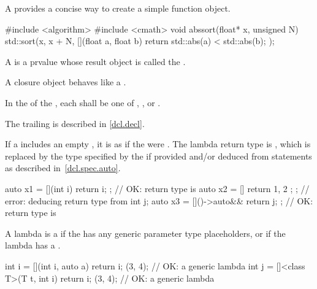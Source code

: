 \begin{bnf}
\br
       
\end{bnf}

\pnum
A  provides
a concise way to create a simple function object.
\begin{example}
\begin{codeblock}
#include <algorithm>
#include <cmath>
void abssort(float* x, unsigned N) {
  std::sort(x, x + N, [](float a, float b) { return std::abs(a) < std::abs(b); });
}
\end{codeblock}
\end{example}

\pnum
A  is a prvalue
whose result object is called the .
\begin{note}
A closure object behaves like a .
\end{note}

\pnum
In the  of the ,
each 
shall be one of , , or .
\begin{note}
The trailing  is described in \ref{dcl.decl}.
\end{note}

\pnum
If a  includes an empty
, it is as if the  were
\tcode{()}.
The lambda return type is , which is replaced by the
type specified by the
 if provided and/or deduced from
 statements as described in~\ref{dcl.spec.auto}.
\begin{example}
\begin{codeblock}
auto x1 = [](int i) { return i; };      // OK: return type is 
auto x2 = []{ return { 1, 2 }; };       // error: deducing return type from 
int j;
auto x3 = []()->auto&& { return j; };   // OK: return type is 
\end{codeblock}
\end{example}

\pnum
A lambda is a 
if the 
has any generic parameter type placeholders, or
if the lambda has a .
\begin{example}
\begin{codeblock}
int i = [](int i, auto a) { return i; }(3, 4);                  // OK: a generic lambda
int j = []<class T>(T t, int i) { return i; }(3, 4);            // OK: a generic lambda
\end{codeblock}
\end{example}

